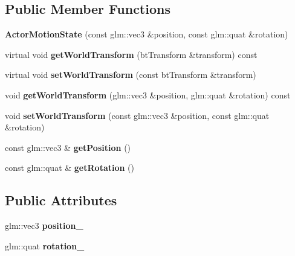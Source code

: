 \subsection*{Public Member Functions}
\begin{DoxyCompactItemize}
\item 
\mbox{\label{classTarbora_1_1ActorMotionState_ae06b97069b1883711ec2828a71ec6da2}} 
{\bfseries Actor\+Motion\+State} (const glm\+::vec3 \&position, const glm\+::quat \&rotation)
\item 
\mbox{\label{classTarbora_1_1ActorMotionState_a6ca1b1961e95b7469e9dbef6d32f38e4}} 
virtual void {\bfseries get\+World\+Transform} (bt\+Transform \&transform) const
\item 
\mbox{\label{classTarbora_1_1ActorMotionState_a116151bb38d94aede50f35841bb03e6b}} 
virtual void {\bfseries set\+World\+Transform} (const bt\+Transform \&transform)
\item 
\mbox{\label{classTarbora_1_1ActorMotionState_a118343149b46f1eb5d01fdd86724f9ef}} 
void {\bfseries get\+World\+Transform} (glm\+::vec3 \&position, glm\+::quat \&rotation) const
\item 
\mbox{\label{classTarbora_1_1ActorMotionState_af6a787efc2a07051dde18a78eef97de8}} 
void {\bfseries set\+World\+Transform} (const glm\+::vec3 \&position, const glm\+::quat \&rotation)
\item 
\mbox{\label{classTarbora_1_1ActorMotionState_a1c3f7ed8f30d1a1e2949c3e03f4b3fcb}} 
const glm\+::vec3 \& {\bfseries get\+Position} ()
\item 
\mbox{\label{classTarbora_1_1ActorMotionState_acb8ec35604c3d3d9aee692703947b0af}} 
const glm\+::quat \& {\bfseries get\+Rotation} ()
\end{DoxyCompactItemize}
\subsection*{Public Attributes}
\begin{DoxyCompactItemize}
\item 
\mbox{\label{classTarbora_1_1ActorMotionState_ac44cb2f74ba0c4f34215a1d95755cd14}} 
glm\+::vec3 {\bfseries position\+\_\+}
\item 
\mbox{\label{classTarbora_1_1ActorMotionState_ab222c596b6124d7f8d9794491a9d10a3}} 
glm\+::quat {\bfseries rotation\+\_\+}
\end{DoxyCompactItemize}


